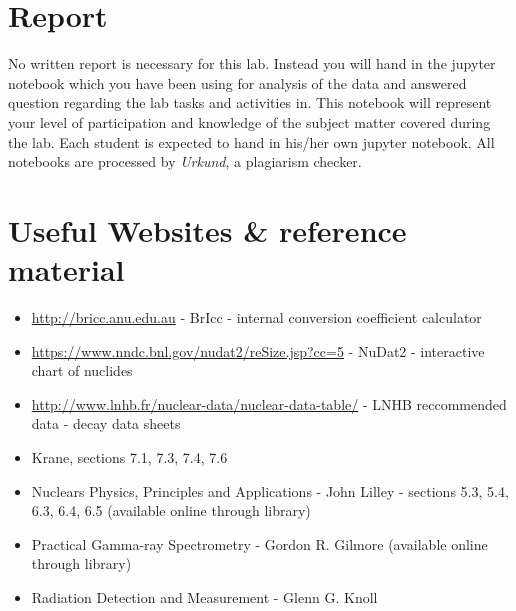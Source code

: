 \documentclass[12pt]{article}
\begin{document}
\section{Report}
No written report is necessary for this lab. Instead you will hand in the jupyter notebook which you have been using for analysis of the data and answered question regarding the lab tasks and activities in. This notebook will represent your level of participation and knowledge of the subject matter covered during the lab. Each student is expected to hand in his/her own jupyter notebook. 
All notebooks are processed by \textit{Urkund}, a plagiarism checker.

\pagebreak
\section{Useful Websites \& reference material}
\begin{itemize}
    \item \href{http://bricc.anu.edu.au}{http://bricc.anu.edu.au} - BrIcc - internal conversion coefficient calculator
    \item \href{https://www.nndc.bnl.gov/nudat2/reSize.jsp?cc=5}{https://www.nndc.bnl.gov/nudat2/reSize.jsp?cc=5} - NuDat2 - interactive chart of nuclides
    \item \href{http://www.lnhb.fr/nuclear-data/nuclear-data-table}{http://www.lnhb.fr/nuclear-data/nuclear-data-table/} - LNHB reccommended data - decay data sheets
    \item Krane, sections 7.1, 7.3, 7.4, 7.6
    \item Nuclears Physics, Principles and Applications - John Lilley - sections 5.3, 5.4, 6.3, 6.4, 6.5 (available online through library)
    \item Practical Gamma-ray Spectrometry - Gordon R. Gilmore (available online through library)
    \item Radiation Detection and Measurement - Glenn G. Knoll
\end{itemize}
\end{document}
